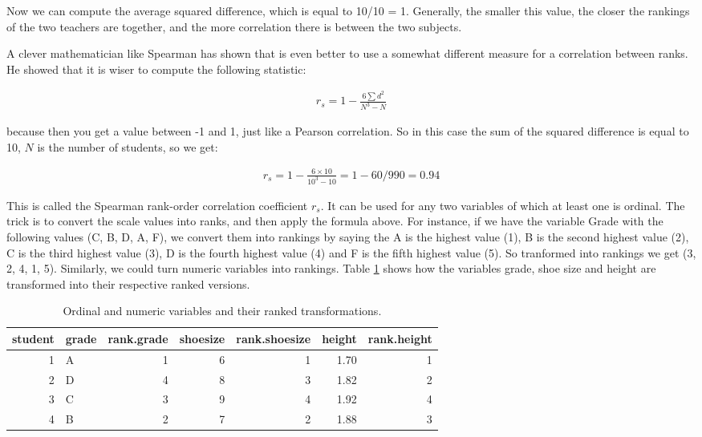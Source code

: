 \documentclass[]{book}\usepackage[]{graphicx}\usepackage[]{color}
\begin{document}
Now we can compute the average squared difference, which is equal to 10/10 = 1. Generally, the smaller this value, the closer the rankings of the two teachers are together, and the more correlation there is between the two subjects. 

A clever mathematician like Spearman has shown that is even better to use a somewhat different measure for a correlation between ranks. He showed that it is wiser to compute the following statistic:

\begin{eqnarray}
r_s = 1 - \frac{6 \sum d^2 }{N^3-N}
\end{eqnarray}

because then you get a value between -1 and 1, just like a Pearson correlation. So in this case the sum of the squared difference is equal to 10, $N$ is the number of students, so we get:


\begin{eqnarray}
r_s = 1 - \frac{6 \times 10  }{10^3-10} = 1 - 60 /990 = 0.94
\end{eqnarray}


This is called the Spearman rank-order correlation coefficient $r_s$. It can be used for any two variables of which at least one is ordinal. The trick is to convert the scale values into ranks, and then apply the formula above. For instance, if we have the variable Grade with the following values (C, B, D, A, F), we convert them into rankings by saying the A is the highest value (1), B is the second highest value (2), C is the third highest value (3), D is the fourth highest value (4) and F is the fifth highest value (5). So tranformed into rankings we get (3, 2, 4, 1, 5). Similarly, we could turn numeric variables into rankings. Table \ref{tab:nonpar_6} shows how the variables grade, shoe size and height are transformed into their respective ranked versions. 

\begin{table}[ht]
\centering
\caption{Ordinal and numeric variables and their ranked transformations.} 
\label{tab:nonpar_6}
\begin{tabular}{rlrrrrr}
  \hline
student & grade & rank.grade & shoesize & rank.shoesize & height & rank.height \\ 
  \hline
1 & A & 1 & 6 & 1 & 1.70 & 1 \\ 
  2 & D & 4 & 8 & 3 & 1.82 & 2 \\ 
  3 & C & 3 & 9 & 4 & 1.92 & 4 \\ 
  4 & B & 2 & 7 & 2 & 1.88 & 3 \\ 
   \hline
\end{tabular}
\end{table}
\end{document}

